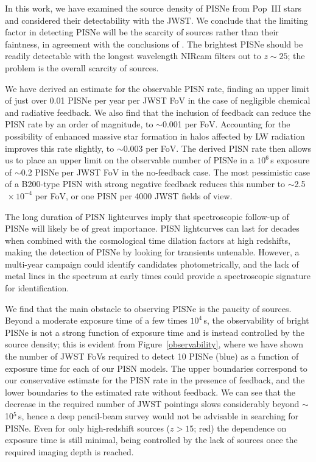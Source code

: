 \documentclass{thesis}
\newcommand{\about}{\ensuremath{\sim}}
\newcommand{\RefFig}[1]{\mbox{Figure~\ref{#1}}}
\begin{document}
In this work, we have examined the source density of PISNe from
Pop~III stars and considered their detectability with the JWST. We
conclude that the limiting factor in detecting PISNe will be the
scarcity of sources rather than their faintness, in agreement with the
conclusions of \citet{WeinmannLilly2005}. The brightest PISNe should
be readily detectable with the longest wavelength NIRcam filters out
to $z\sim25$; the problem is the overall scarcity of sources.

 We have derived an estimate for the observable PISN rate, finding an
 upper limit of just over 0.01 PISNe per year per JWST FoV in the case
 of negligible chemical and radiative feedback. We also find that the
 inclusion of feedback can reduce the PISN rate by an order of
 magnitude, to \about0.001 per FoV. Accounting for the possibility of
 enhanced massive star formation in halos affected by LW radiation improves
 this rate slightly, to \about0.003 per FoV.  The derived PISN rate
 then allows us to place an upper limit on the observable number of
 PISNe in a $10^6\,$s exposure of \about0.2 PISNe per JWST FoV in the
 no-feedback case. The most pessimistic case of a B200-type PISN with
 strong negative feedback reduces this number to
 \about2.5$\,\times10^{-4}$ per FoV, or one PISN per 4000 JWST fields
 of view.

 The long duration of PISN lightcurves imply that spectroscopic
 follow-up of PISNe will likely be of great importance. PISN
 lightcurves can last for decades when combined with the cosmological
 time dilation factors at high redshifts, making the detection of
 PISNe by looking for transients untenable.  However, a multi-year
 campaign could identify candidates photometrically, and the lack of
 metal lines in the spectrum at early times could provide a
 spectroscopic signature for identification.

We find that the main obstacle to observing PISNe is the paucity of
sources.  Beyond a moderate exposure time of a few times $10^4\,$s,
the observability of bright PISNe is not a strong function of exposure
time and is instead controlled by the source density; this is evident
from \RefFig{observability}, where we have shown the number of JWST
FoVs required to detect 10 PISNe (blue) as a function of exposure time
for each of our PISN models.  The upper boundaries correspond to our
conservative estimate for the PISN rate in the presence of feedback,
and the lower boundaries to the estimated rate without feedback. We can
see that the decrease in the required number of JWST pointings slows
considerably beyond \about10$^5\,$s, hence a deep pencil-beam survey
would not be advisable in searching for PISNe. Even for only
high-redshift sources ($z>15$; red) the dependence on exposure time is
still minimal, being controlled by the lack of sources once the
required imaging depth is reached.
\end{document}
